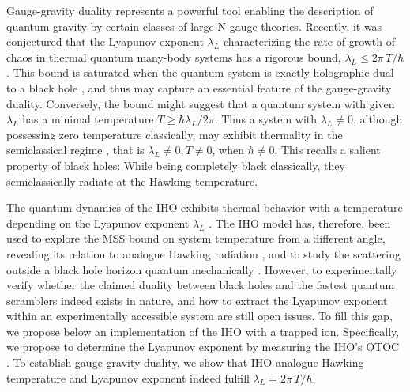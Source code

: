 \documentclass[prl,twocolumn,superscriptaddress,floatfix,showpacs,amsmath,longbibliography,nofootinbib,amssymb]{revtex4-1}
\begin{document}
Gauge-gravity duality \cite{GGD1, PhysRevD.58.046004} represents a powerful %
tool enabling the description of quantum gravity by certain classes of  
large-N gauge theories. 
Recently, it was conjectured that the Lyapunov exponent $\lambda_L$
characterizing the rate of growth of chaos in thermal quantum many-body systems 
has a rigorous bound, $\lambda_L\leq2\pi\,T/\hbar$ \cite{bound}. 
This bound is saturated when the quantum system 
is exactly holographic dual to a black hole \cite{QBC1, Sekino_2008, Franz:2018cqi}, 
and thus may capture an essential feature of the gauge-gravity duality. 
Conversely, the bound might suggest that a %
quantum system with given $\lambda_L$ has a minimal temperature $T\ge\hbar\lambda_L/2\pi$. 
Thus a system with $\lambda_L\neq 0$, although possessing zero temperature classically, 
may exhibit thermality in the semiclassical regime \cite{PhysRevLett.122.101603}, that is
$\lambda_L\neq 0, T\neq 0$, when $\hbar\neq 0$.
This recalls a salient property of black holes: While being completely black classically, 
they semiclassically radiate at the Hawking temperature.  


The quantum dynamics of the IHO exhibits thermal behavior with a temperature depending
on the %
Lyapunov exponent $\lambda_L$ \cite{PhysRevLett.122.101603, Betzios, Maldacena_2005}. 
The IHO model has, therefore, been used to 
explore the MSS bound on system temperature from a different angle,  
revealing its relation to analogue Hawking radiation %
 \cite{PhysRevLett.122.101603},
and to study the scattering outside a black hole horizon quantum mechanically \cite{Betzios, Maldacena_2005}. 
However,  to experimentally verify whether the claimed duality between black holes and the fastest quantum scramblers  
indeed exists in nature, and how to extract the Lyapunov exponent within an experimentally accessible system 
are still open issues. 
To fill this gap, we propose below an implementation of the IHO with a trapped ion.
Specifically, we propose to determine the Lyapunov exponent by measuring the IHO's 
OTOC \cite{1969JETP1200L, bound}. 
To establish gauge-gravity duality, we show that IHO analogue Hawking temperature and  
Lyapunov exponent indeed fulfill $\lambda_L= 2\pi\,T/\hbar$. 
\end{document}
